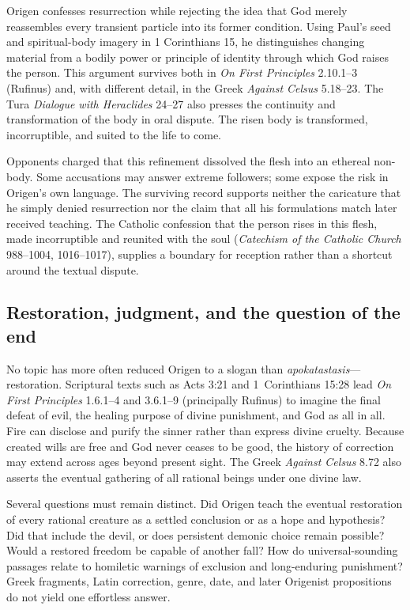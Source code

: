 Origen confesses resurrection while rejecting the idea that God merely
reassembles every transient particle into its former condition. Using Paul's
seed and spiritual-body imagery in 1 Corinthians 15, he distinguishes changing
material from a bodily power or principle of identity through which God raises
the person. This argument survives both in \emph{On First Principles}
2.10.1--3 (Rufinus) and, with different detail, in the Greek \emph{Against
Celsus} 5.18--23. The Tura \emph{Dialogue with Heraclides} 24--27 also presses
the continuity and transformation of the body in oral dispute. The risen body
is transformed, incorruptible, and suited to the life to come.

Opponents charged that this refinement dissolved the flesh into an ethereal
non-body. Some accusations may answer extreme followers; some expose
the risk in Origen's own language. The surviving record supports neither the
caricature that he simply denied resurrection nor the claim that all his
formulations match later received teaching. The Catholic confession that the
person rises in this flesh, made incorruptible and reunited with the soul
(\emph{Catechism of the Catholic Church} 988--1004, 1016--1017), supplies a
boundary for reception rather than a shortcut around the textual dispute.

\subsection{Restoration, judgment, and the question of the end}

No topic has more often reduced Origen to a slogan than
\emph{apokatastasis}---restoration. Scriptural texts such as Acts 3:21 and
1~Corinthians 15:28 lead \emph{On First Principles} 1.6.1--4 and 3.6.1--9
(principally Rufinus) to imagine the final defeat of evil, the healing
purpose of divine punishment, and God as all in all. Fire can disclose and
purify the sinner rather than express divine cruelty. Because created wills
are free and God never ceases to be good, the history of correction may extend
across ages beyond present sight. The Greek \emph{Against Celsus} 8.72 also
asserts the eventual gathering of all rational beings under one divine law.

Several questions must remain distinct. Did Origen teach the eventual
restoration of every rational creature as a settled conclusion or as a hope
and hypothesis? Did that include the devil, or does persistent demonic choice
remain possible? Would a restored freedom be capable of another fall? How do
universal-sounding passages relate to homiletic warnings of exclusion and
long-enduring punishment? Greek fragments, Latin correction, genre, date, and
later Origenist propositions do not yield one effortless answer.


